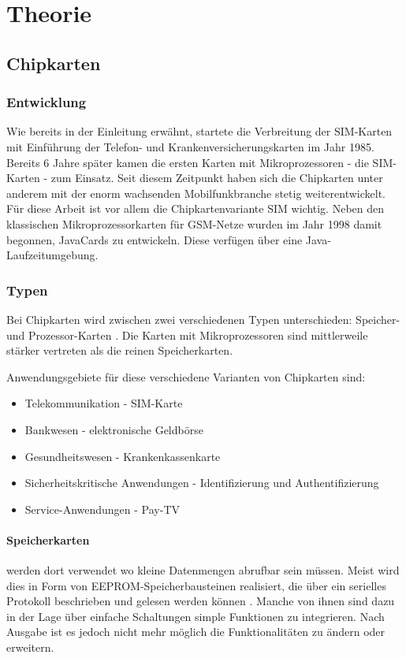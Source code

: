 \clearpage

\section[Theorie (Schenkel \& Heumann)]{Theorie}
\label{theorie}

\subsection[Chipkarten (Schenkel)]{Chipkarten}
\subsubsection[Entwicklung (Schenkel)]{Entwicklung}
Wie bereits in der Einleitung erwähnt, startete die Verbreitung der SIM-Karten
mit Einführung der Telefon- und Krankenversicherungskarten im Jahr 1985.
Bereits 6 Jahre später kamen die ersten Karten mit Mikroprozessoren - die \ac{SIM}-Karten
- zum Einsatz. Seit diesem Zeitpunkt haben sich die Chipkarten unter anderem
mit der enorm wachsenden Mobilfunkbranche stetig weiterentwickelt. Für diese
Arbeit ist vor allem die Chipkartenvariante \ac{SIM} wichtig.
Neben den klassischen Mikroprozessorkarten für \ac{GSM}-Netze wurden im Jahr
1998 damit begonnen, JavaCards zu entwickeln. Diese verfügen über eine
Java-Laufzeitumgebung.

\subsubsection[Typen (Schenkel)]{Typen}
Bei Chipkarten wird zwischen zwei verschiedenen Typen unterschieden:
Speicher- und Prozessor-Karten \cite{chipkarten02}. Die Karten mit Mikroprozessoren
sind mittlerweile stärker vertreten als die reinen Speicherkarten.

Anwendungsgebiete für diese verschiedene Varianten von Chipkarten sind:
\begin{itemize}
\item Telekommunikation - \ac{SIM}-Karte
\item Bankwesen - elektronische Geldbörse
\item Gesundheitswesen - Krankenkassenkarte
\item Sicherheitskritische Anwendungen - Identifizierung und Authentifizierung
\item Service-Anwendungen - Pay-TV
\end{itemize}

\paragraph{Speicherkarten} werden dort verwendet wo kleine Datenmengen abrufbar
sein müssen. Meist wird dies in Form von \ac{EEPROM}-Speicherbausteinen realisiert,
die über ein serielles Protokoll beschrieben und gelesen werden können \cite{spitz11}.
Manche von ihnen sind dazu in der Lage über einfache Schaltungen simple Funktionen
zu integrieren. Nach Ausgabe ist es jedoch nicht mehr möglich die Funktionalitäten
zu ändern oder erweitern.

